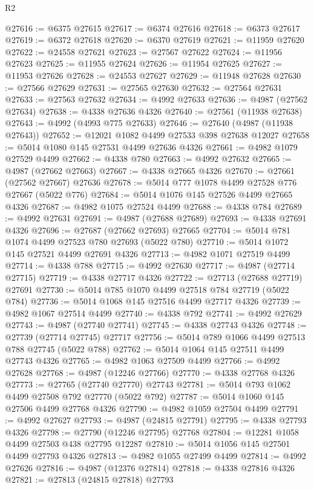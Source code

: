 \begin{lexlean}{R2}
\begin{coremodule}
@27616 := @6375 @27615
@27617 := @6374 @27616
@27618 := @6373 @27617
@27619 := @6372 @27618
@27620 := @6370 @27619
@27621 := @11959 @27620
@27622 := @24558 @27621
@27623 := @27567 @27622
@27624 := @11956 @27623
@27625 := @11955 @27624
@27626 := @11954 @27625
@27627 := @11953 @27626
@27628 := @24553 @27627
@27629 := @11948 @27628
@27630 := @27566 @27629
@27631 := @27565 @27630
@27632 := @27564 @27631
@27633 := @27563 @27632
@27634 := @4992 @27633
@27636 := @4987 (@27562 @27634)
@27638 := @4338 @27636 @4326
@27640 := @27561 (@11938 @27638)
@27643 := @4992 (@4993 @775 @27633)
@27646 := @27640 (@4987 (@11938 @27643))
@27652 := @12021 @1082 @4499 @27533 @398 @27638 @12027
@27658 := @5014 @1080 @145 @27531 @4499 @27636 @4326
@27661 := @4982 @1079 @27529 @4499
@27662 := @4338 @780
@27663 := @4992 @27632
@27665 := @4987 (@27662 @27663)
@27667 := @4338 @27665 @4326
@27670 := @27661 (@27562 @27667) @27636
@27678 := @5014 @777 @1078 @4499 @27528 @776 @27667 (@5022 @776)
@27684 := @5014 @1076 @145 @27526 @4499 @27665 @4326
@27687 := @4982 @1075 @27524 @4499
@27688 := @4338 @784
@27689 := @4992 @27631
@27691 := @4987 (@27688 @27689)
@27693 := @4338 @27691 @4326
@27696 := @27687 (@27662 @27693) @27665
@27704 := @5014 @781 @1074 @4499 @27523 @780 @27693 (@5022 @780)
@27710 := @5014 @1072 @145 @27521 @4499 @27691 @4326
@27713 := @4982 @1071 @27519 @4499
@27714 := @4338 @788
@27715 := @4992 @27630
@27717 := @4987 (@27714 @27715)
@27719 := @4338 @27717 @4326
@27722 := @27713 (@27688 @27719) @27691
@27730 := @5014 @785 @1070 @4499 @27518 @784 @27719 (@5022 @784)
@27736 := @5014 @1068 @145 @27516 @4499 @27717 @4326
@27739 := @4982 @1067 @27514 @4499
@27740 := @4338 @792
@27741 := @4992 @27629
@27743 := @4987 (@27740 @27741)
@27745 := @4338 @27743 @4326
@27748 := @27739 (@27714 @27745) @27717
@27756 := @5014 @789 @1066 @4499 @27513 @788 @27745 (@5022 @788)
@27762 := @5014 @1064 @145 @27511 @4499 @27743 @4326
@27765 := @4982 @1063 @27509 @4499
@27766 := @4992 @27628
@27768 := @4987 (@12246 @27766)
@27770 := @4338 @27768 @4326
@27773 := @27765 (@27740 @27770) @27743
@27781 := @5014 @793 @1062 @4499 @27508 @792 @27770 (@5022 @792)
@27787 := @5014 @1060 @145 @27506 @4499 @27768 @4326
@27790 := @4982 @1059 @27504 @4499
@27791 := @4992 @27627
@27793 := @4987 (@24815 @27791)
@27795 := @4338 @27793 @4326
@27798 := @27790 (@12246 @27795) @27768
@27804 := @12281 @1058 @4499 @27503 @438 @27795 @12287
@27810 := @5014 @1056 @145 @27501 @4499 @27793 @4326
@27813 := @4982 @1055 @27499 @4499
@27814 := @4992 @27626
@27816 := @4987 (@12376 @27814)
@27818 := @4338 @27816 @4326
@27821 := @27813 (@24815 @27818) @27793

\end{coremodule}
\end{lexlean}
